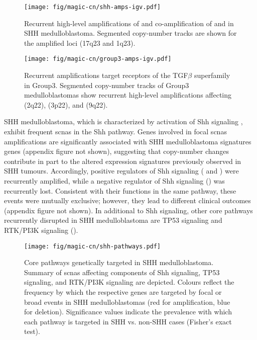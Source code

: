 \clearpage

\begin{SCfigure}[1][t]
	\centering
	\texttt{[image: fig/magic-cn/shh-amps-igv.pdf]}
	\caption[Recurrent amplifications of , , and  in SHH medulloblastoma]
	{
	Recurrent high-level amplifications of  and co-amplification of  and  in SHH medulloblastoma.
	Segmented copy-number tracks are shown for the amplified loci (17q23 and 1q23).
	}
	\label{fig:shh-amps-igv}
\end{SCfigure}

\begin{SCfigure}[1][b]
	\centering
	\texttt{[image: fig/magic-cn/group3-amps-igv.pdf]}
	\caption[Recurrent amplifications target receptors of the TGF$\beta$ superfamily in Group3]
	{
	Recurrent amplifications target receptors of the TGF$\beta$ superfamily in Group3.
	Segmented copy-number tracks of Group3 medulloblastomas show recurrent high-level amplifications affecting  (2q22),  (3p22), and  (9q22).
	}
	\label{fig:group3-amps-igv}
\end{SCfigure}

\clearpage

SHH medulloblastoma, which is characterized by activation of Shh signaling , exhibit frequent \gls{scnas} in the Shh pathway. Genes involved in focal \gls{scnas} amplifications are significantly associated with SHH medulloblastoma signatures genes (appendix figure not shown), suggesting that copy-number changes contribute in part to the altered expression signatures previously observed in SHH tumours. Accordingly, positive regulators of Shh signaling ( and ) were recurrently amplified, while a negative regulator of Shh signaling () was recurrently lost. Consistent with their functions in the same pathway, these events were mutually exclusive; however, they lead to different clinical outcomes (appendix figure not shown). In additional to Shh signaling, other core pathways recurrently disrupted in SHH medulloblastoma are TP53 signaling and RTK/PI3K signaling ().

\begin{SCfigure}[5]
	\centering
	\texttt{[image: fig/magic-cn/shh-pathways.pdf]}
	\caption[Core pathways genetically targeted in SHH medulloblastoma]
	{
	Core pathways genetically targeted in SHH medulloblastoma.
	Summary of \gls{scnas} affecting components of Shh signaling, TP53 signaling, and RTK/PI3K signaling are depicted. Colours reflect the frequency by which the respective genes are targeted by focal or broad events in SHH medulloblastomas (red for amplification, blue for deletion). Significance values indicate the prevalence with which each pathway is targeted in SHH vs. non-SHH cases (Fisher's exact test).
	}
	\label{fig:shh-pathways}
\end{SCfigure}

